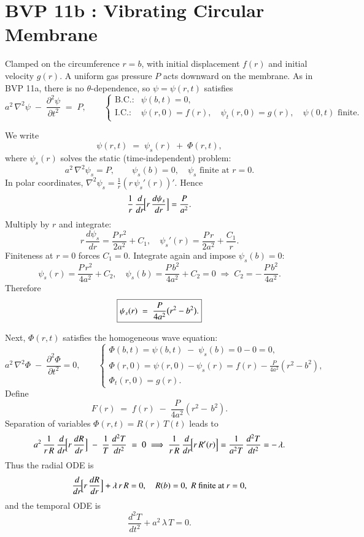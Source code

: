 \documentclass{report}
\begin{document}
\section{BVP 11b : Vibrating Circular Membrane}

Clamped on the circumference \(r=b\), with initial displacement \(f(r)\) and initial velocity \(g(r)\).  A uniform gas pressure \(P\) acts downward on the membrane.  As in BVP 11a, there is no \(\theta\)-dependence, so \(\psi=\psi(r,t)\) satisfies
\[
a^{2}\,\nabla^{2}\psi \;-\; \frac{\partial^{2}\psi}{\partial t^{2}} \;=\; P,
\qquad
\begin{cases}
\text{B.C.:}& \psi(b,t) = 0,\\
\text{I.C.:}& \psi(r,0) = f(r),\quad \psi_{t}(r,0) = g(r),\quad \psi(0,t)\text{ finite.}
\end{cases}
\]

We write 
\[
\psi(r,t) \;=\; \psi_{s}(r) \;+\; \Phi(r,t),
\]
where \(\psi_{s}(r)\) solves the static (time-independent) problem:
\[
a^{2}\,\nabla^{2}\psi_{s} = P,
\qquad
\psi_{s}(b)=0,\quad \psi_{s}\text{ finite at }r=0.
\]
In polar coordinates, \(\nabla^{2}\psi_{s} = \frac{1}{r}(r\,\psi_{s}'(r))'\).  Hence
\[
\frac{1}{r}\,\frac{d}{dr}\!\Bigl[r\,\frac{d\psi_{s}}{dr}\Bigr] = \frac{P}{a^{2}}.
\]
Multiply by \(r\) and integrate:
\[
r\,\frac{d\psi_{s}}{dr} = \frac{P\,r^{2}}{2a^{2}} + C_{1},
\quad
\psi_{s}'(r) = \frac{P\,r}{2a^{2}} + \frac{C_{1}}{r}.
\]
Finiteness at \(r=0\) forces \(C_{1}=0\).  Integrate again and impose \(\psi_{s}(b)=0\):
\[
\psi_{s}(r) 
= \frac{P\,r^{2}}{4a^{2}} + C_{2}, 
\quad
\psi_{s}(b) = \frac{P\,b^{2}}{4a^{2}} + C_{2} = 0 
\;\Longrightarrow\; C_{2} = -\,\frac{P\,b^{2}}{4a^{2}}.
\]
Therefore
\[
\boxed{%
\psi_{s}(r) \;=\; \frac{P}{4a^{2}}\bigl(r^{2} - b^{2}\bigr).
}
\]

Next, \(\Phi(r,t)\) satisfies the homogeneous wave equation:
\[
a^{2}\,\nabla^{2}\Phi \;-\; \frac{\partial^{2}\Phi}{\partial t^{2}} = 0,
\qquad
\begin{cases}
\Phi(b,t) = \psi(b,t)\;-\;\psi_{s}(b) = 0 - 0 = 0,\\
\Phi(r,0) = \psi(r,0) - \psi_{s}(r) = f(r) - \frac{P}{4a^{2}}(r^{2}-b^{2}),\\
\Phi_{t}(r,0) = g(r).
\end{cases}
\]
Define 
\[
F(r) \;=\; f(r) \;-\; \frac{P}{4a^{2}}(r^{2}-\,b^{2}).
\]
Separation of variables \(\Phi(r,t) = R(r)\,T(t)\) leads to
\[
a^{2}\,\frac{1}{r\,R}\,\frac{d}{dr}\!\Bigl[r\,\frac{dR}{dr}\Bigr]
\;-\;
\frac{1}{T}\,\frac{d^{2}T}{dt^{2}}
\;=\;0
\;\Longrightarrow\;
\frac{1}{r\,R}\,\frac{d}{dr}\!\Bigl[r\,R'(r)\Bigr] 
= \frac{1}{a^{2}T}\,\frac{d^{2}T}{dt^{2}} 
= -\,\lambda.
\]
Thus the radial ODE is
\[
\frac{d}{dr}\!\Bigl[r\,\frac{dR}{dr}\Bigr] + \lambda\,r\,R = 0,
\quad 
R(b)=0,\;R\text{ finite at }r=0,
\]
and the temporal ODE is
\[
\frac{d^{2}T}{dt^{2}} + a^{2}\,\lambda\,T = 0.
\]
\end{document}

